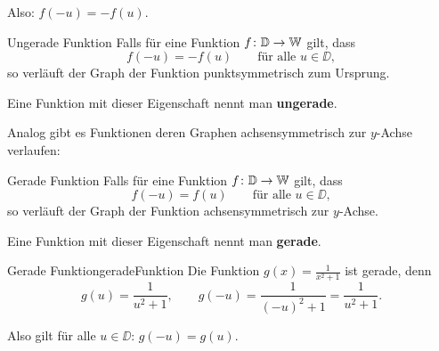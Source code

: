 Also: \(f(-u)=-f(u)\).

\begin{definition}
    {Ungerade Funktion}{}
    Falls für eine Funktion \(f\colon \mathbb{D} \to \mathbb{W}\) gilt, dass
    \[
        f(-u)=-f(u)
        \qquad \text{für alle } u\in\DD,
    \]
    so verläuft der Graph der Funktion punktsymmetrisch zum Ursprung.

    Eine Funktion mit dieser Eigenschaft nennt man \textbf{ungerade}.
\end{definition}
Analog gibt es Funktionen deren Graphen achsensymmetrisch zur \(y\)-Achse verlaufen:
\begin{definition}
    {Gerade Funktion}{}
    Falls für eine Funktion \(f\colon \mathbb{D} \to \mathbb{W}\) gilt, dass
    \[
        f(-u)=f(u)
        \qquad \text{für alle } u\in\DD,
    \]
    so verläuft der Graph der Funktion achsensymmetrisch zur \(y\)-Achse.

    Eine Funktion mit dieser Eigenschaft nennt man \textbf{gerade}.
\end{definition}
\begin{bsp}
    {Gerade Funktion}{geradeFunktion}
    Die Funktion \(g(x)=\frac{1}{x^2+1}\) ist gerade, denn
    \[
        g(u)=\frac{1}{u^2+1},
        \qquad
        g(-u)=\frac{1}{(-u)^2+1}
        =\frac{1}{u^2+1}.
    \]

    Also gilt für alle \(u\in\DD\):
    \(g(-u)=g(u)\).

    \begin{center}
    \end{center}
\end{bsp}
